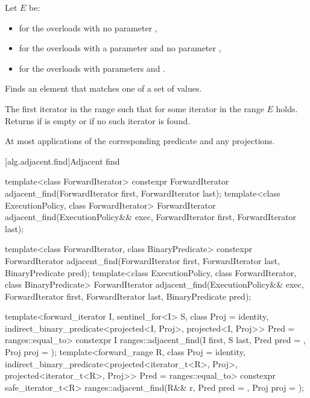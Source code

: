 \begin{itemdescr}
\pnum
Let $E$ be:
\begin{itemize}
\item {} for the overloads with no parameter ,
\item {} for the overloads with a parameter  and no parameter ,
\item {} for the overloads with parameters  and .
\end{itemize}

\pnum
\effects
Finds an element that matches one of a set of values.

\pnum
\returns
The first iterator  in the range 
such that for some iterator  in the range 
$E$ holds.
Returns 
if  is empty or
if no such iterator is found.

\pnum
\complexity
At most  applications
of the corresponding predicate and any projections.
\end{itemdescr}

[alg.adjacent.find]{Adjacent find}

%
\begin{itemdecl}
template<class ForwardIterator>
  constexpr ForwardIterator
    adjacent_find(ForwardIterator first, ForwardIterator last);
template<class ExecutionPolicy, class ForwardIterator>
  ForwardIterator
    adjacent_find(ExecutionPolicy&& exec,
                  ForwardIterator first, ForwardIterator last);

template<class ForwardIterator, class BinaryPredicate>
  constexpr ForwardIterator
    adjacent_find(ForwardIterator first, ForwardIterator last,
                  BinaryPredicate pred);
template<class ExecutionPolicy, class ForwardIterator, class BinaryPredicate>
  ForwardIterator
    adjacent_find(ExecutionPolicy&& exec,
                  ForwardIterator first, ForwardIterator last,
                  BinaryPredicate pred);

template<forward_iterator I, sentinel_for<I> S, class Proj = identity,
         indirect_binary_predicate<projected<I, Proj>,
                                   projected<I, Proj>> Pred = ranges::equal_to>
  constexpr I ranges::adjacent_find(I first, S last, Pred pred = {}, Proj proj = {});
template<forward_range R, class Proj = identity,
         indirect_binary_predicate<projected<iterator_t<R>, Proj>,
                                   projected<iterator_t<R>, Proj>> Pred = ranges::equal_to>
  constexpr safe_iterator_t<R> ranges::adjacent_find(R&& r, Pred pred = {}, Proj proj = {});
\end{itemdecl}

